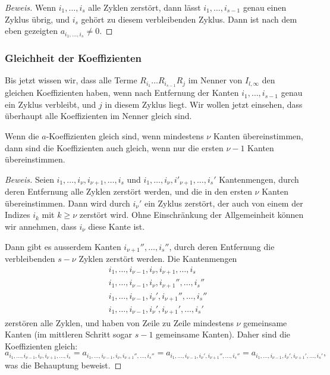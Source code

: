 \begin{proof}[Beweis]
Wenn $i_1,\dots,i_s$ alle Zyklen zerstört, dann lässt
$i_1,\dots,i_{s-1}$ genau einen Zyklus übrig, und $i_s$ 
gehört zu diesem verbleibenden Zyklus. Dann ist nach dem
eben gezeigten $a_{i_1,\dots,i_s}\ne 0$.
\end{proof}

\subsubsection{Gleichheit der Koeffizienten}
Bis jetzt wissen wir, dass alle Terme $R_{i_1}\dots R_{i_{s-1}}R_j$
im Nenner von $I_{l,\infty}$ den gleichen Koeffizienten haben,
wenn nach Entfernung der Kanten $i_1,\dots,i_{s-1}$ genau ein
Zyklus verbleibt, und $j$ in diesem Zyklus liegt. Wir wollen jetzt
einsehen, dass überhaupt alle Koeffizienten im Nenner gleich sind.

\begin{hilfssatz}
\label{gleichekoef-induktionsschritt}
Wenn die $a$-Koeffizienten gleich sind,
wenn mindestens $\nu$ Kanten übereinstimmen,
dann sind die Koeffizienten auch gleich,
wenn nur die ersten $\nu-1$ Kanten übereinstimmen.
\end{hilfssatz}

\begin{proof}[Beweis]
Seien
$i_1,\dots,i_\nu,i_{\nu+1},\dots,i_s$
und
$i_1,\dots,i_{\nu},i'_{\nu+1},\dots,i_s'$
Kantenmengen,
durch deren
Entfernung alle Zyklen zerstört werden,
und die in den ersten $\nu$ Kanten übereinstimmen.
Dann wird durch $i_\nu'$ ein Zyklus zerstört, der auch von einem
der Indizes $i_{k}$ mit $k\ge\nu$ zerstört wird. Ohne Einschränkung
der Allgemeinheit können wir annehmen, dass $i_{\nu}$ diese Kante ist.

Dann gibt es ausserdem Kanten $i_{\nu+1}'',\dots,i_s''$, durch deren
Entfernung die verbleibenden $s-\nu$ Zyklen zerstört werden. Die Kantenmengen
\begin{align*}
&i_1,\dots,i_{\nu-1},i_{\nu},i_{\nu+1},\dots,i_s\\
&i_1,\dots,i_{\nu-1},i_{\nu},i_{\nu+1}'',\dots,i_s''\\
&i_1,\dots,i_{\nu-1},i_{\nu}',i_{\nu+1}'',\dots,i_s''\\
&i_1,\dots,i_{\nu-1},i_{\nu}',i_{\nu+1}',\dots,i_s'
\end{align*}
zerstören alle Zyklen, und haben von Zeile zu Zeile mindestens
$\nu$ gemeinsame Kanten (im mittleren Schritt sogar $s-1$
gemeinsame Kanten). Daher sind die Koeffizienten gleich:
\[
a_{i_1,\dots,i_{\nu-1},i_{\nu},i_{\nu+1},\dots,i_s}
=
a_{i_1,\dots,i_{\nu-1},i_{\nu},i_{\nu+1}'',\dots,i_s''}
=
a_{i_1,\dots,i_{\nu-1},i_{\nu}',i_{\nu+1}'',\dots,i_s''}
=
a_{i_1,\dots,i_{\nu-1},i_{\nu}',i_{\nu+1}',\dots,i_s'},
\]
was die Behauptung beweist.
\end{proof}

